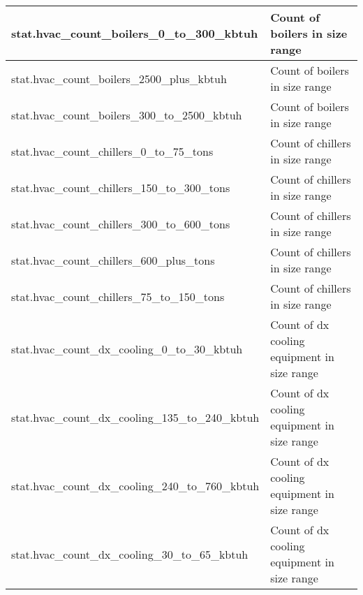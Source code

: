\begin{center}
\begin{longtable}{|p{3in}|p{3in}|}
stat.hvac\_count\_boilers\_0\_to\_300\_kbtuh               & Count of boilers in size range                                                                                        \\ \hline
stat.hvac\_count\_boilers\_2500\_plus\_kbtuh               & Count of boilers in size range                                                                                        \\ \hline
stat.hvac\_count\_boilers\_300\_to\_2500\_kbtuh            & Count of boilers in size range                                                                                        \\ \hline
stat.hvac\_count\_chillers\_0\_to\_75\_tons                & Count of chillers in size range                                                                                       \\ \hline
stat.hvac\_count\_chillers\_150\_to\_300\_tons             & Count of chillers in size range                                                                                       \\ \hline
stat.hvac\_count\_chillers\_300\_to\_600\_tons             & Count of chillers in size range                                                                                       \\ \hline
stat.hvac\_count\_chillers\_600\_plus\_tons                & Count of chillers in size range                                                                                       \\ \hline
stat.hvac\_count\_chillers\_75\_to\_150\_tons              & Count of chillers in size range                                                                                       \\ \hline
stat.hvac\_count\_dx\_cooling\_0\_to\_30\_kbtuh            & Count of dx cooling equipment in size range                                                                           \\ \hline
stat.hvac\_count\_dx\_cooling\_135\_to\_240\_kbtuh         & Count of dx cooling equipment in size range                                                                           \\ \hline
stat.hvac\_count\_dx\_cooling\_240\_to\_760\_kbtuh         & Count of dx cooling equipment in size range                                                                           \\ \hline
stat.hvac\_count\_dx\_cooling\_30\_to\_65\_kbtuh           & Count of dx cooling equipment in size range                                                                           \\ \hline

\end{longtable}
\end{center}
